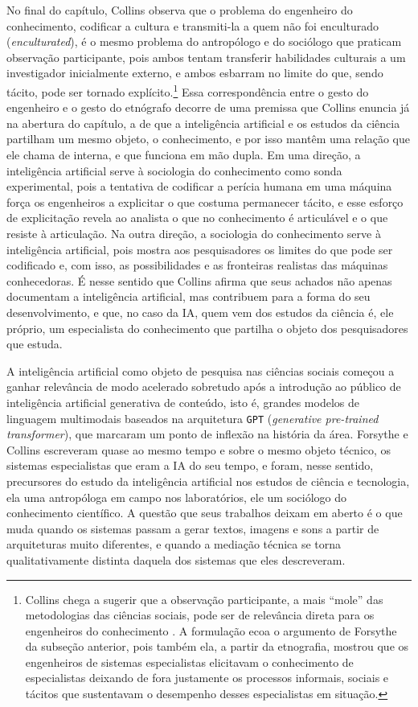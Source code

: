 No final do capítulo, Collins observa que o problema do engenheiro do conhecimento, codificar a cultura e transmiti-la a quem não foi enculturado (\textit{enculturated}), é o mesmo problema do antropólogo e do sociólogo que praticam observação participante, pois ambos tentam transferir habilidades culturais a um investigador inicialmente externo, e ambos esbarram no limite do que, sendo tácito, pode ser tornado explícito.\footnote{Collins chega a sugerir que a observação participante, a mais \enquote{mole} das metodologias das ciências sociais, pode ser de relevância direta para os engenheiros do conhecimento \parencite[pp.~336--337]{Collins2012Expert}. A formulação ecoa o argumento de Forsythe da subseção anterior, pois também ela, a partir da etnografia, mostrou que os engenheiros de sistemas especialistas elicitavam o conhecimento de especialistas deixando de fora justamente os processos informais, sociais e tácitos que sustentavam o desempenho desses especialistas em situação.} Essa correspondência entre o gesto do engenheiro e o gesto do etnógrafo decorre de uma premissa que Collins enuncia já na abertura do capítulo, a de que a inteligência artificial e os estudos da ciência partilham um mesmo objeto, o conhecimento, e por isso mantêm uma relação que ele chama de interna, e que funciona em mão dupla. Em uma direção, a inteligência artificial serve à sociologia do conhecimento como sonda experimental, pois a tentativa de codificar a perícia humana em uma máquina força os engenheiros a explicitar o que costuma permanecer tácito, e esse esforço de explicitação revela ao analista o que no conhecimento é articulável e o que resiste à articulação. Na outra direção, a sociologia do conhecimento serve à inteligência artificial, pois mostra aos pesquisadores os limites do que pode ser codificado e, com isso, as possibilidades e as fronteiras realistas das máquinas conhecedoras. É nesse sentido que Collins afirma que seus achados não apenas documentam a inteligência artificial, mas contribuem para a forma do seu desenvolvimento, e que, no caso da IA, quem vem dos estudos da ciência é, ele próprio, um especialista do conhecimento que partilha o objeto dos pesquisadores que estuda.

A inteligência artificial como objeto de pesquisa nas ciências sociais começou a ganhar relevância de modo acelerado sobretudo após a introdução ao público de inteligência artificial generativa de conteúdo, isto é, grandes modelos de linguagem multimodais baseados na arquitetura \texttt{GPT} (\textit{generative pre-trained transformer}), que marcaram um ponto de inflexão na história da área. Forsythe e Collins escreveram quase ao mesmo tempo e sobre o mesmo objeto técnico, os sistemas especialistas que eram a IA do seu tempo, e foram, nesse sentido, precursores do estudo da inteligência artificial nos estudos de ciência e tecnologia, ela uma antropóloga em campo nos laboratórios, ele um sociólogo do conhecimento científico. A questão que seus trabalhos deixam em aberto é o que muda quando os sistemas passam a gerar textos, imagens e sons a partir de arquiteturas muito diferentes, e quando a mediação técnica se torna qualitativamente distinta daquela dos sistemas que eles descreveram.

